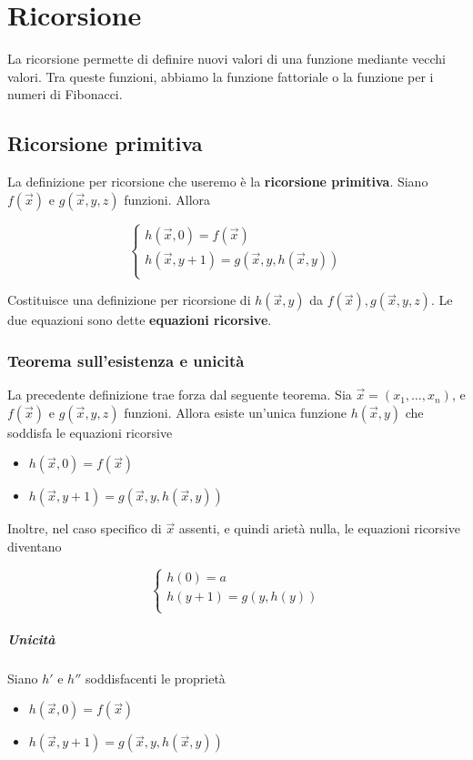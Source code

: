 \chapter{Ricorsione}
	
	La ricorsione permette di definire nuovi valori di una funzione mediante vecchi valori. Tra queste funzioni, abbiamo la funzione fattoriale o la funzione per i numeri di Fibonacci.
	
	\section{Ricorsione primitiva}
	La definizione per ricorsione che useremo è la \textbf{ricorsione primitiva}. Siano $f(\vec{x})$ e $g(\vec{x},y,z)$ funzioni. Allora
	
	$$
	\begin{cases}
	h(\vec{x}, 0) = f(\vec{x})\\
	h(\vec{x}, y+1) = g(\vec{x}, y, h(\vec{x}, y))\\
	\end{cases}
	$$
	
	Costituisce una definizione per ricorsione di $h(\vec{x}, y)$ da $f(\vec{x}), g(\vec{x}, y, z)$. Le due equazioni sono dette \textbf{equazioni ricorsive}.
	
	\subsection{Teorema sull'esistenza e unicità}
	La precedente definizione trae forza dal seguente teorema. 
	Sia $\vec{x} = (x_1, \dots, x_n)$, e $f(\vec{x})$ e $g(\vec{x},y,z)$ funzioni. Allora esiste un'unica funzione $h(\vec{x}, y)$ che soddisfa le equazioni ricorsive
	
	
	\begin{itemize}
	\item $h(\vec{x}, 0) = f(\vec{x})$
	\item $h(\vec{x}, y+1)  = g(\vec{x}, y, h(\vec{x}, y))$
	\end{itemize}
	
	
	Inoltre, nel caso specifico di $\vec{x}$ assenti, e quindi arietà nulla, le equazioni ricorsive diventano
	
	$$
	\begin{cases}
		h(0) = a\\
		h(y+1) = g(y, h(y))\\
	\end{cases}
	$$
	
	\paragraph{Unicità} Siano $h'$ e $h''$ soddisfacenti le proprietà
	\begin{itemize}
		\item $h(\vec{x},0) = f(\vec{x})$
		\item $h(\vec{x}, y+1) = g(\vec{x},y,h(\vec{x},y))$
	\end{itemize}
	
